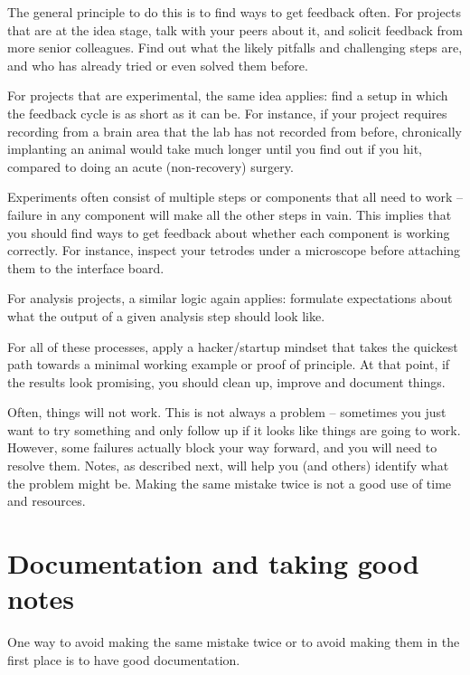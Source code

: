 \documentclass{tufte-book}
\begin{document}
The general principle to do this is to find ways to get feedback
often. For projects that are at the idea stage, talk with your peers
about it, and solicit feedback from more senior colleagues. Find out
what the likely pitfalls and challenging steps are, and who has
already tried or even solved them before.

For projects that are experimental, the same idea applies: find a
setup in which the feedback cycle is as short as it can be. For
instance, if your project requires recording from a brain area that
the lab has not recorded from before, chronically implanting an animal
would take much longer until you find out if you hit, compared to
doing an acute (non-recovery) surgery.

Experiments often consist of multiple steps or components that all
need to work -- failure in any component will make all the other steps
in vain. This implies
that you should find ways to get feedback about whether each component
is working correctly. For instance, inspect your tetrodes under a
microscope before attaching them to the interface board.

For analysis projects, a similar logic again applies: formulate
expectations about what the output of a given analysis step should
look like. 

For all of these processes, apply a hacker/startup mindset that takes
the quickest path towards a minimal working example or proof of
principle. At that point, if the results look promising, you should
clean up, improve and document things.

Often, things will not work. This is not always a problem -- sometimes
you just want to try something and only follow up if it looks like
things are going to work. However, some failures actually block your
way forward, and you will need to resolve them. Notes, as described
next, will help you (and others) identify what the problem might
be. Making the same mistake twice is not a good use of time and
resources.

\section{Documentation and taking good notes}
\label{sec:notes}

One way to avoid making the same mistake twice or to avoid making them
in the first place is to have good documentation.
\end{document}

